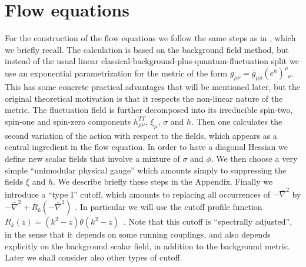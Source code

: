 \documentclass[a4paper,11pt]{revtex4}
\newcommand{\bnabla}{\bar\nabla}
\begin{document}
\section{Flow equations}

For the construction of the flow equations we follow the same steps
as in \cite{pv1}, which we briefly recall.
The calculation is based on the background field method,
but instead of the usual linear classical-background-plus-quantum-fluctuation split we use an exponential parametrization
for the metric of the form 
$g_{\mu\nu}=\bar g_{\mu\rho}(e^h)^\rho{}_\nu$.
This has some concrete practical advantages that will be 
mentioned later, 
but the original theoretical motivation is that it
respects the non-linear nature of the metric.
The fluctuation field is further decomposed into its irreducible
spin-two, spin-one and spin-zero components $h_{\mu\nu}^{TT}$,
$\xi_\mu$, $\sigma$ and $h$.
Then one calculates the second variation of the action with
respect to the fields, which appears as a central ingredient
in the flow equation.
In order to have a diagonal Hessian we define new scalar fields
that involve a mixture of $\sigma$ and $\phi$.
We then choose a very simple ``unimodular physical gauge''
which amounts simply to suppressing the fields $\xi$ and $h$.
We describe briefly these steps in the Appendix. 
Finally we introduce a ``type I'' cutoff, which amounts to replacing
all occurrences of $-\bnabla^2$ by $-\bnabla^2+R_k(-\bnabla^2)$
\cite{cpr2}. 
In particular we will use the cutoff profile function 
$R_k(z)=\left(k^2-z\right)\theta\left(k^2-z\right)$~\cite{Litim}.
Note that this cutoff is ``spectrally adjusted'',
in the sense that it depends on some running couplings,
and also depends explicitly on the background scalar field,
in addition to the background metric.
Later we shall consider also other types of cutoff.
\end{document}
